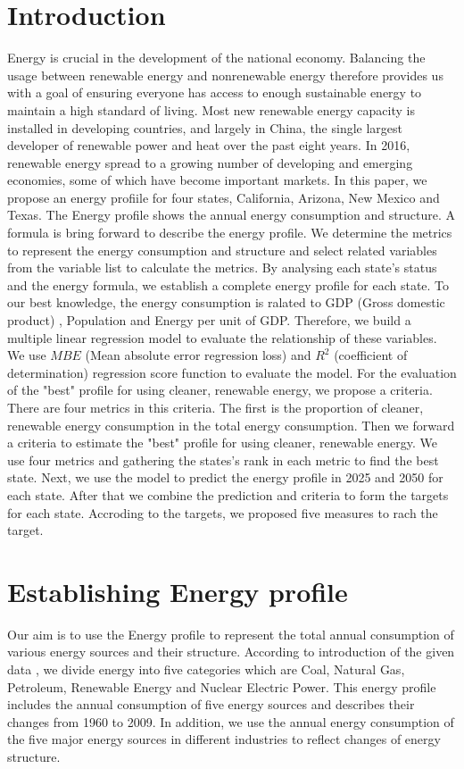 \documentclass{mcmthesis}
\begin{document}
\section{Introduction}
Energy is crucial in the development of the national economy. Balancing the usage between renewable energy and nonrenewable energy therefore provides us with a goal of ensuring everyone has access to enough sustainable energy to maintain a high standard of living.
Most new renewable energy capacity is installed in developing
countries, and largely in China, the single largest developer of
renewable power and heat over the past eight years. In 2016,
renewable energy spread to a growing number of developing and
emerging economies, some of which have become important
markets.
In this paper, we propose an energy profiile for four states, California, Arizona, New Mexico and Texas. The Energy profile shows the annual energy consumption and structure.
A formula is bring forward to describe the energy profile. We determine the metrics to represent the energy consumption and structure and select related variables from the variable list to calculate the metrics.
By analysing each state's status and the energy formula, we establish a complete energy profile for each state.
To our best knowledge, the energy consumption is ralated to
GDP (Gross domestic product) , Population and Energy per unit of GDP. Therefore, we build a multiple linear regression model to evaluate the relationship of these variables.
We use $MBE$ (Mean absolute error regression loss) and $R^2$ (coefficient of determination) regression score function to evaluate the model.
For the evaluation of the "best" profile for using cleaner, renewable energy, we propose a criteria. There are four metrics in this criteria. The first is the proportion of cleaner, renewable energy consumption in the total energy consumption.
Then we forward a criteria to estimate the "best" profile for using cleaner, renewable energy.
We use four metrics and gathering the states's rank in each metric to find the best state.
Next, we use the model to predict the energy profile in 2025 and 2050 for each state. After that we combine the prediction and criteria to form the targets for each state.
Accroding to the targets, we proposed five measures to rach the target.
\section{Establishing Energy profile}
Our aim is to use the Energy profile to represent the total annual consumption of various energy
sources and their structure. According to introduction of the given data \cite{1},
we divide energy into five categories which are Coal, Natural Gas, Petroleum, Renewable Energy and Nuclear Electric Power.
This energy profile includes the annual consumption of five energy sources and describes their changes from 1960 to 2009.
In addition, we use the annual energy consumption of the five major energy sources
in different industries to reflect changes of energy structure.
\end{document}
